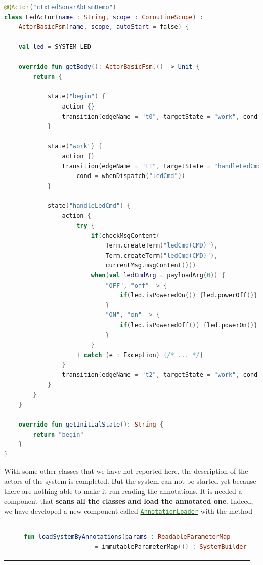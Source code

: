 \begin{lstlisting}[caption=\texttt{LedActor (\texttt{ledsonarsystem0})},language=Kotlin]
@QActor("ctxLedSonarAbFsmDemo")
class LedActor(name : String, scope : CoroutineScope) :
	ActorBasicFsm(name, scope, autoStart = false) {

	val led = SYSTEM_LED

	override fun getBody(): ActorBasicFsm.() -> Unit {
		return {
			
			state("begin") {
				action {}
				transition(edgeName = "t0", targetState = "work", cond = doswitch())
			}
			
			state("work") {
				action {}
				transition(edgeName = "t1", targetState = "handleLedCmd",
					cond = whenDispatch("ledCmd"))
			}
			
			state("handleLedCmd") {
				action {
					try {
						if(checkMsgContent(
							Term.createTerm("ledCmd(CMD)"),
							Term.createTerm("ledCmd(CMD)"),
							currentMsg.msgContent()))
						when(val ledCmdArg = payloadArg(0)) {
							"OFF", "off" -> {
								if(led.isPoweredOn()) {led.powerOff()}
							}
							"ON", "on" -> {
								if(led.isPoweredOff()) {led.powerOn()}
							}
						}
					} catch (e : Exception) {/* ... */}
				}
				transition(edgeName = "t2", targetState = "work", cond = doswitch())
			}
		}
	}

	override fun getInitialState(): String {
		return "begin"
	}
}
\end{lstlisting}

With some other classes that we have not reported here, the description of the actors of the system is completed. But the system can not be started yet because there are nothing able to make it run reading the annotations. It is needed a component that \textbf{scans all the classes and load the annotated one}.
Indeed, we have developed a new component called \href{https://github.com/LM-96/QA-Extensions/blob/main/it.unibo.qakactor/src/main/kotlin/annotations/AnnotationLoader.kt}{\textcolor{ForestGreen}{\texttt{AnnotationLoader}}} with the method 
\begin{center}
	\begin{tabular}{c}
		\begin{lstlisting}[frame=none,numbers=none,language=Kotlin]
			fun loadSystemByAnnotations(params : ReadableParameterMap
						= immutableParameterMap()) : SystemBuilder
		\end{lstlisting}
	\end{tabular}
\end{center}


